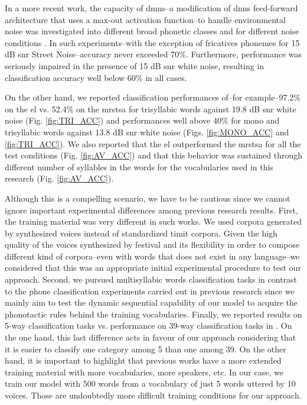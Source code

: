 \documentclass[10pt,letterpaper]{article}
\begin{document}
In a more recent work, the capacity of \glspl{dmn}--a modification of \glspl{dnn} feed-forward architecture that uses a max-out activation function--to handle environmental noise was investigated into different broad phonetic classes and for different noise conditions \cite{silos_2016}.  In such experiments--with the exception of fricatives phonemes for 15 dB \gls{snr} Street Noise--accuracy never exceeded 70\%. Furthermore, performance was seriously impaired in the presence of 15 dB \gls{snr} white noise, resulting in classification accuracy  well below 60\% in all cases.

On the other hand, we reported classification performances of--for example--97.2\% on the \gls{el} vs. 52.4\% on the \gls{mrstsa} for trisyllabic words against 19.8 dB \gls{snr} white noise (Fig. \ref{fig:TRI_ACC}) and performances well above 40\% for mono and trisyllabic words against 13.8 dB \gls{snr} white noise (Figs. \ref{fig:MONO_ACC} and \ref{fig:TRI_ACC}). We also reported that the \gls{el} outperformed the \gls{mrstsa} for all the test conditions (Fig. \ref{fig:AV_ACC}) and that this behavior was sustained through different number of syllables in the words for the vocabularies used in this research (Fig. \ref{fig:AV_ACC}).

Although this is a compelling scenario, we have to be cautious since we cannot ignore important experimental differences among previous research results. First, the training material was very different in such works. We used corpora generated by synthesized voices instead of standardized \gls{timit} corpora.
Given the high quality of the voices synthesized by \gls{festival} \cite{festival2014} and its flexibility in order to compose different kind of corpora--even with words that does not exist in any language--we considered that this was an appropriate initial experimental procedure to test our approach. 
Second, we pursued multisyllabic words classification tasks in contrast to the phone classification experiments carried out in previous research
since we mainly aim to test the dynamic sequential capability of our model to acquire the phonotactic rules behind the training vocabularies. 
Finally, we reported results on 5-way classification tasks vs. performance on 39-way classification tasks in \cite{Lee:2009:UFL:2984093.2984217}. 
On the one hand, this last difference acts in favour of our approach considering that it is easier to classify one category among 5 than one among 39.
On the other hand, it is important to highlight that previous works have a more extended training material with more vocabularies, more speakers, etc.
In our case, we train our model with 500 words from a vocabulary of just 5 words uttered by 10 voices.
Those are undoubtedly more difficult training conditions for our approach. 
\end{document}
